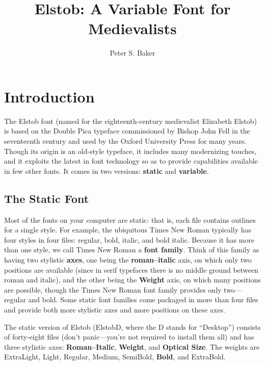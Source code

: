\documentclass[12pt,letterpaper,openany]{book}
\title{Elstob: A Variable Font for Medievalists}
\author{Peter S. Baker}
\begin{document}
\maketitle

\chapter{Introduction}

\pagestyle{fancy}

The Elstob font (named for the eighteenth-century medievalist Elizabeth Elstob)
is based on the Double Pica typeface commissioned by Bishop John Fell in the
seventeenth century and used by the Oxford University Press for many years.
Though its origin is an old-style typeface, it includes many modernizing touches,
and it exploits the latest in font technology so as to provide capabilities
available in few other fonts. It comes in two versions: \textbf{static} and
\textbf{variable}.

\section{The Static Font}

Most of the fonts on your
computer are static: that is, each file contains outlines for a single style.
For example, the ubiquitous Times New Roman typically has four styles in four
files: regular, bold, italic, and bold italic. Because it has more than one
style, we call Times New Roman a \textbf{font family}. Think of this family as
having two stylistic \textbf{axes}, one being the \textbf{roman--italic} axis, on which
only two positions are available (since in serif typefaces there is no middle
ground between roman and italic), and
the other being the \textbf{Weight} axis, on which many positions are possible,
though the Times New Roman font family provides only two---regular and bold.
Some static font families come packaged in more than four files and provide both more
stylistic axes and more positions on these axes.

The static version of Elstob (ElstobD, where the D stands for “Desktop”) consists
of forty-eight files (don’t panic---you’re not required to install them all) and
has three stylistic
axes: \textbf{Roman--Italic}, \textbf{Weight}, and \textbf{Optical Size}. The
weights are {\extralight ExtraLight}, {\light Light}, Regular, {\medium Medium},
{\semibold SemiBold}, \textbf{Bold}, and {\extrabold ExtraBold}.
\end{document}
